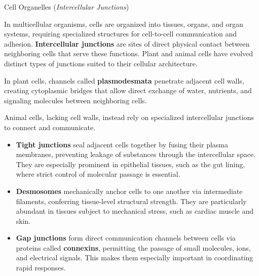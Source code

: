 \documentclass[10pt]{article}
\begin{document}
    \begin{core}[label=core:ij]{Cell Organelles (\textit{Intercellular Junctions})}

      In multicellular organisms, cells are organized into tissues, organs, and organ systems, requiring specialized structures for cell-to-cell communication and adhesion. \textbf{Intercellular junctions} are sites of direct physical contact between neighboring cells that serve these functions. Plant and animal cells have evolved distinct types of junctions suited to their cellular architecture.

      In plant cells, channels called \textbf{plasmodesmata} penetrate adjacent cell walls, creating cytoplasmic bridges that allow direct exchange of water, nutrients, and signaling molecules between neighboring cells.


      Animal cells, lacking cell walls, instead rely on specialized intercellular junctions to connect and communicate.

      \begin{itemize}

        \item \textbf{Tight junctions} seal adjacent cells together by fusing their plasma membranes, preventing leakage of substances through the intercellular space. They are especially prominent in epithelial tissues, such as the gut lining, where strict control of molecular passage is essential.

        \item \textbf{Desmosomes} mechanically anchor cells to one another via intermediate filaments, conferring tissue-level structural strength. They are particularly abundant in tissues subject to mechanical stress, such as cardiac muscle and skin.

        \item \textbf{Gap junctions} form direct communication channels between cells via proteins called \textbf{connexins}, permitting the passage of small molecules, ions, and electrical signals. This makes them especially important in coordinating rapid responses.

      \end{itemize}


    \end{core}
\end{document}

